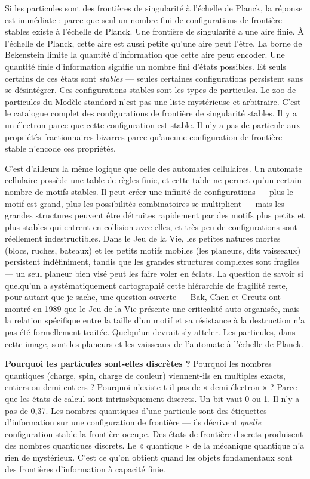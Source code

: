 \documentclass[11pt, twoside, openright]{book}
\begin{document}
Si les particules sont des frontières de singularité à l'échelle de Planck, la réponse est immédiate : parce que seul un nombre fini de configurations de frontière stables existe à l'échelle de Planck. Une frontière de singularité a une aire finie. À l'échelle de Planck, cette aire est aussi petite qu'une aire peut l'être. La borne de Bekenstein limite la quantité d'information que cette aire peut encoder. Une quantité finie d'information signifie un nombre fini d'états possibles. Et seuls certains de ces états sont \textit{stables} --- seules certaines configurations persistent sans se désintégrer. Ces configurations stables sont les types de particules. Le zoo de particules du Modèle standard n'est pas une liste mystérieuse et arbitraire. C'est le catalogue complet des configurations de frontière de singularité stables. Il y a un électron parce que cette configuration est stable. Il n'y a pas de particule aux propriétés fractionnaires bizarres parce qu'aucune configuration de frontière stable n'encode ces propriétés.

C'est d'ailleurs la même logique que celle des automates cellulaires. Un automate cellulaire possède une table de règles finie, et cette table ne permet qu'un certain nombre de motifs stables. Il peut créer une infinité de configurations --- plus le motif est grand, plus les possibilités combinatoires se multiplient --- mais les grandes structures peuvent être détruites rapidement par des motifs plus petits et plus stables qui entrent en collision avec elles, et très peu de configurations sont réellement indestructibles. Dans le Jeu de la Vie, les petites natures mortes (blocs, ruches, bateaux) et les petits motifs mobiles (les planeurs, dits vaisseaux) persistent indéfiniment, tandis que les grandes structures complexes sont fragiles --- un seul planeur bien visé peut les faire voler en éclats. La question de savoir si quelqu'un a systématiquement cartographié cette hiérarchie de fragilité reste, pour autant que je sache, une question ouverte --- Bak, Chen et Creutz ont montré en 1989 que le Jeu de la Vie présente une criticalité auto-organisée, mais la relation spécifique entre la taille d'un motif et sa résistance à la destruction n'a pas été formellement traitée. Quelqu'un devrait s'y atteler. Les particules, dans cette image, sont les planeurs et les vaisseaux de l'automate à l'échelle de Planck.

\textbf{Pourquoi les particules sont-elles discrètes ?} Pourquoi les nombres quantiques (charge, spin, charge de couleur) viennent-ils en multiples exacts, entiers ou demi-entiers ? Pourquoi n'existe-t-il pas de « demi-électron » ? Parce que les états de calcul sont intrinsèquement discrets. Un bit vaut 0 ou 1. Il n'y a pas de 0,37. Les nombres quantiques d'une particule sont des étiquettes d'information sur une configuration de frontière --- ils décrivent \textit{quelle} configuration stable la frontière occupe. Des états de frontière discrets produisent des nombres quantiques discrets. Le « quantique » de la mécanique quantique n'a rien de mystérieux. C'est ce qu'on obtient quand les objets fondamentaux sont des frontières d'information à capacité finie.
\end{document}
